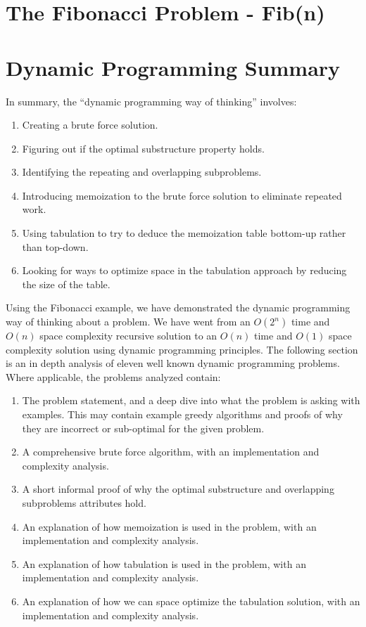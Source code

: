 \section{The Fibonacci Problem - Fib(n)}


\section{Dynamic Programming Summary}

In summary, the ``dynamic programming way of thinking'' involves:
\begin{enumerate}
    \item Creating a brute force solution.
    \item Figuring out if the optimal substructure property holds.
    \item Identifying the repeating and overlapping subproblems.
    \item Introducing memoization to the brute force solution to eliminate repeated work.
    \item Using tabulation to try to deduce the memoization table bottom-up rather than top-down.
    \item Looking for ways to optimize space in the tabulation approach by reducing the size of the table.
\end{enumerate}

Using the Fibonacci example, we have demonstrated the dynamic programming way of thinking about a problem.
We have went from an $O(2^n)$ time and $O(n)$ space complexity recursive solution to an $O(n)$ time and $O(1)$ space complexity solution using dynamic programming principles.
The following section is an in depth analysis of eleven well known dynamic programming problems.
Where applicable, the problems analyzed contain:

\begin{enumerate}
    \item The problem statement, and a deep dive into what the problem is asking with examples. This may contain example greedy algorithms and proofs of why they are incorrect or sub-optimal for the given problem.
    \item A comprehensive brute force algorithm, with an implementation and complexity analysis.
    \item A short informal proof of why the optimal substructure and overlapping subproblems attributes hold.
    \item An explanation of how memoization is used in the problem, with an implementation and complexity analysis.
    \item An explanation of how tabulation is used in the problem, with an implementation and complexity analysis.
    \item An explanation of how we can space optimize the tabulation solution, with an implementation and complexity analysis.

\end{enumerate}

